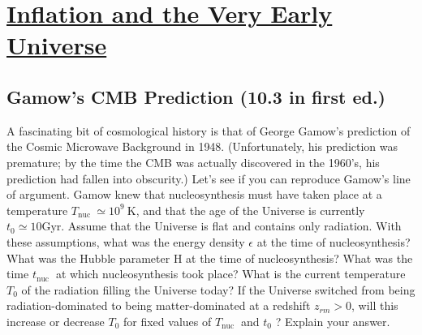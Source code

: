 \section[Inflation and the Very Early Universe]{\hyperlink{toc}{Inflation and the Very Early Universe}}

\subsection{}
\subsection{}
\subsection{}
\subsection*{Gamow's CMB Prediction (10.3 in first ed.)}
\begin{tcolorbox}
    A fascinating bit of cosmological history is that of George Gamow's prediction of the Cosmic Microwave Background in 1948. (Unfortunately, his prediction was premature; by the time the CMB was actually discovered in the 1960's, his prediction had fallen into obscurity.) Let's see if you can reproduce Gamow's line of argument. Gamow knew that nucleosynthesis must have taken place at a temperature $T_{\text {nuc }} \simeq 10^{9} \mathrm{~K}$, and that the age of the Universe is currently $t_{0} \simeq 10 \mathrm{Gyr}$. Assume that the Universe is flat and contains only radiation. With these assumptions, what was the energy density $\epsilon$ at the time of nucleosynthesis? What was the Hubble parameter $\mathrm{H}$ at the time of nucleosynthesis? What was the time $t_{\text {nuc }}$ at which nucleosynthesis took place? What is the current temperature $T_{0}$ of the radiation filling the Universe today? If the Universe switched from being radiation-dominated to being matter-dominated at a redshift $z_{r m}>0$, will this increase or decrease $T_{0}$ for fixed values of $T_{\text {nuc }}$ and $t_{0}$ ? Explain your answer.
\end{tcolorbox}